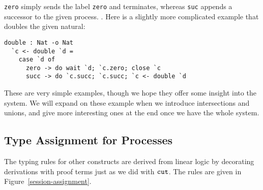 \documentclass[a4paper,USenglish]{lipics-v2016}
\begin{document}
\texttt{zero} simply sends the label \texttt{zero} and terminates, whereas \texttt{suc} appends a successor to the given process. . Here is a slightly more complicated example that doubles the given natural:

\begin{lstlisting}[language=krill, style=custom]
  double : Nat -o Nat
  `c <- double `d =
    case `d of
      zero -> do wait `d; `c.zero; close `c
      succ -> do `c.succ; `c.succ; `c <- double `d
\end{lstlisting}

These are very simple examples, though we hope they offer some insight into the system. We will expand on these example when we introduce intersections and unions, and give more interesting ones at the end once we have the whole system.


\subsection{Type Assignment for Processes}

The typing rules for other constructs are derived from linear logic by decorating derivations with proof terms just as we did with $\texttt{cut}$. The rules are given in Figure~\ref{session-assignment}.  

\end{document}
